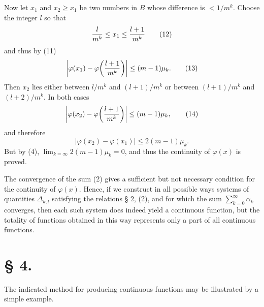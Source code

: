 Now let $x_1$ and $x_2\ge x_1$ be two numbers in $B$ whose difference is $<1/m^k$. Choose the integer $l$ so that
\begin{equation}
 {l\over m^k}\le x_1\le {l+1\over m^k}
\tag{12}
\end{equation}
and thus by (11)
\begin{equation}
 \left|\varphi(x_1)-\varphi\!\left({l+1\over m^k}\right)\right|\le(m-1)\mu_k.
\tag{13}
\end{equation}
Then $x_2$ lies either between $l/m^k$ and $(l+1)/m^k$ or between $(l+1)/m^k$ and $(l+2)/m^k$. In both cases
\begin{equation}
 \left|\varphi(x_2)-\varphi\!\left({l+1\over m^k}\right)\right|\le(m-1)\mu_k,
\tag{14}
\end{equation}
and therefore
\begin{equation}
 |\varphi(x_2)-\varphi(x_1)|\le2(m-1)\mu_k.
\tag{14'}
\end{equation}
But by (4), $\lim_{k=\infty}2(m-1)\mu_k=0$, and thus the continuity of $\varphi(x)$ is proved.

The convergence of the sum (2) gives a sufficient but not necessary condition for the continuity of $\varphi(x)$. Hence, if we construct in all possible ways systems of quantities $\Delta_{k,l}$ satisfying the relations § 2, (2), and for which the sum $\sum_{k=0}^{\infty}\alpha_k$ converges, then each such system does indeed yield a continuous function, but the totality of functions obtained in this way represents only a part of all continuous functions.

\section*{§ 4.}

The indicated method for producing continuous functions may be illustrated by a simple example.

